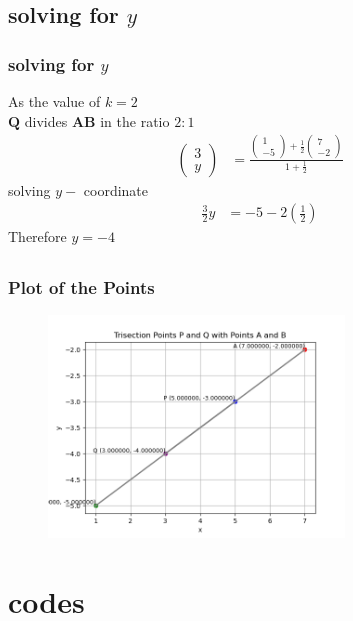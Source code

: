 \documentclass{beamer}
\providecommand{\brak}[1]{\ensuremath{\left(#1\right)}}
\theoremstyle{remark}
\newcommand{\myvec}[1]{\ensuremath{\begin{pmatrix}#1\end{pmatrix}}}
\let\vec\mathbf
\numberwithin{equation}{section}
\begin{document}
\subsection{solving for $y$}
\begin{frame}
\frametitle{solving for $y$}
As the value of $k=2$\\
$\vec{Q}$ divides $\vec{AB}$ in the ratio $2:1$
\begin{align}
\myvec{3\\ y }&=\frac{\myvec{1\\-5}+\frac{1}{2}\myvec{7\\-2}}{1+\frac{1}{2}}
\end{align}
solving $y-$ coordinate
\begin{align}
\frac{3}{2}y&=-5-2\brak{\frac{1}{2}}
\end{align}
Therefore $y=-4$
\end{frame}
\subsection{}
\begin{frame}[fragile]
\frametitle{Plot of the Points}
\begin{figure}[h!]


 \centering
    \includegraphics[width=0.7\textwidth]{figs/Figpresent.png}
\end{figure}
\end{frame}
\section{codes}
\end{document}
